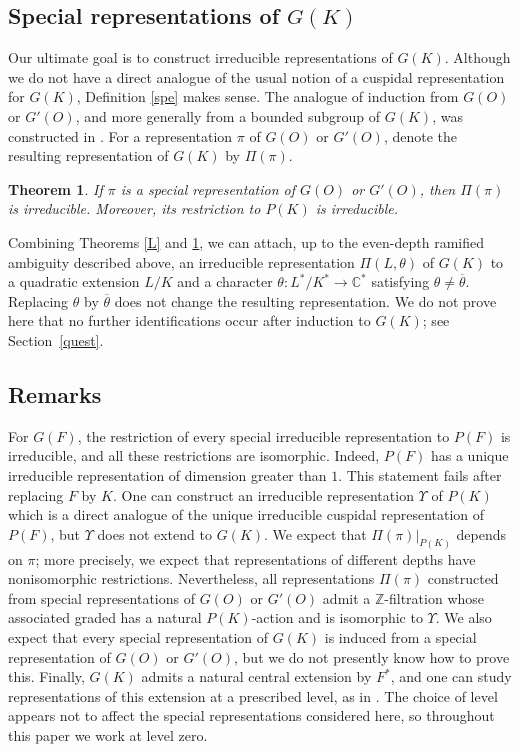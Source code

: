 \documentclass[11pt,a4paper,twoside]{amsart}
\newtheorem{theorem}{Theorem}[section]
\theoremstyle{definition}
\theoremstyle{remark}
\newcommand{\CC}{\mathbb C}
\newcommand{\ZZ}{\mathbb Z}
\newcommand{\otheta}{\overline{\theta}}
\begin{document}
\subsection{Special representations of $G(K)$}
Our ultimate goal is to construct irreducible representations of $G(K)$. Although we do not have a direct analogue of the usual notion of a cuspidal representation for $G(K)$, Definition \ref{spe} makes sense.
The analogue of induction from $G(O)$ or $G'(O)$, and more generally from a bounded subgroup of $G(K)$, was constructed in \cite{GK}. For a representation $\pi$ of $G(O)$ or $G'(O)$, denote the resulting representation of $G(K)$ by $\Pi(\pi)$.
\begin{theorem}\label{irreducible}
If $\pi$ is a special representation of $G(O)$ or $G'(O)$, then $\Pi(\pi)$ is irreducible. Moreover, its restriction to $P(K)$ is irreducible.
\end{theorem}
Combining Theorems \ref{L} and \ref{irreducible}, we can attach, up to the even-depth ramified ambiguity described above, an irreducible representation $\Pi(L,\theta)$ of $G(K)$ to a quadratic extension $L/K$ and a character $\theta:L^*/K^*\to\CC^*$ satisfying $\theta\neq\otheta$. Replacing $\theta$ by $\otheta$ does not change the resulting representation. We do not prove here that no further identifications occur after induction to $G(K)$; see Section~\ref{quest}.
\subsection{Remarks}
For $G(F)$, the restriction of every special irreducible representation to $P(F)$ is irreducible, and all these restrictions are isomorphic. Indeed, $P(F)$ has a unique irreducible representation of dimension greater than $1$.
This statement fails after replacing $F$ by $K$. One can construct an irreducible representation $\Upsilon$ of $P(K)$ which is a direct analogue of the unique irreducible cuspidal representation of $P(F)$, but $\Upsilon$ does not extend to $G(K)$. We expect that $\Pi(\pi)|_{P(K)}$ depends on $\pi$; more precisely, we expect that representations of different depths have nonisomorphic restrictions. Nevertheless, all representations $\Pi(\pi)$ constructed from special representations of $G(O)$ or $G'(O)$ admit a $\ZZ$-filtration whose associated graded has a natural $P(K)$-action and is isomorphic to $\Upsilon$.
We also expect that every special representation of $G(K)$ is induced from a special representation of $G(O)$ or $G'(O)$, but we do not presently know how to prove this.
Finally, $G(K)$ admits a natural central extension by $F^*$, and one can study representations of this extension at a prescribed level, as in \cite{GK}. The choice of level appears not to affect the special representations considered here, so throughout this paper we work at level zero.
\end{document}
